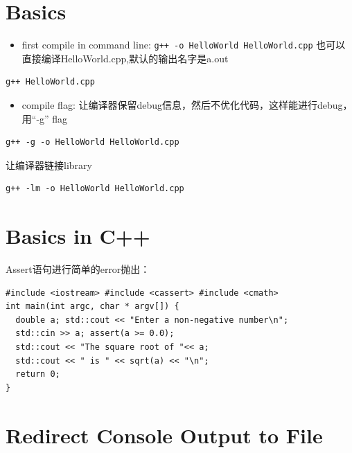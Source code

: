 \documentclass[
]{book}
\providecommand{\tightlist}{%
  \setlength{\itemsep}{0pt}\setlength{\parskip}{0pt}}
\theoremstyle{definition}
\theoremstyle{definition}
\theoremstyle{definition}
\theoremstyle{remark}
\begin{document}
\hypertarget{basics}{%
\section{Basics}\label{basics}}

\begin{itemize}
\tightlist
\item
  first compile in command line:
  \texttt{g++\ -o\ HelloWorld\ HelloWorld.cpp}
  也可以直接编译HelloWorld.cpp,默认的输出名字是a.out
\end{itemize}

\begin{verbatim}
g++ HelloWorld.cpp
\end{verbatim}

\begin{itemize}
\tightlist
\item
  compile flag:
  让编译器保留debug信息，然后不优化代码，这样能进行debug，用``-g'' flag
\end{itemize}

\begin{verbatim}
g++ -g -o HelloWorld HelloWorld.cpp
\end{verbatim}

让编译器链接library

\begin{verbatim}
g++ -lm -o HelloWorld HelloWorld.cpp
\end{verbatim}

\hypertarget{basics-in-c}{%
\section{Basics in C++}\label{basics-in-c}}

Assert语句进行简单的error抛出：

\begin{verbatim}
#include <iostream> #include <cassert> #include <cmath>
int main(int argc, char * argv[]) {
  double a; std::cout << "Enter a non-negative number\n"; 
  std::cin >> a; assert(a >= 0.0); 
  std::cout << "The square root of "<< a; 
  std::cout << " is " << sqrt(a) << "\n"; 
  return 0;
}
\end{verbatim}

\hypertarget{redirect-console-output-to-file}{%
\section{Redirect Console Output to File}\label{redirect-console-output-to-file}}
\end{document}
